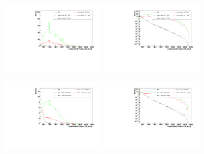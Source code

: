\begin{figure}[h]
  \begin{center}
	\includegraphics[width=0.45\textwidth]{Plots/aQGC_kinematics/ungroomed_PuppiAK8_jet_pt_FS0.pdf}%
	\includegraphics[width=0.45\textwidth]{Plots/aQGC_kinematics/ungroomed_PuppiAK8_jet_pt_FS0_log.pdf}\\
    \caption{}
  \end{center}
\end{figure}
\begin{figure}[h]
  \begin{center}
	\includegraphics[width=0.45\textwidth]{Plots/aQGC_kinematics/ungroomed_PuppiAK8_jet_pt_FS1.pdf}%
	\includegraphics[width=0.45\textwidth]{Plots/aQGC_kinematics/ungroomed_PuppiAK8_jet_pt_FS1_log.pdf}\\
    \caption{}
  \end{center}
\end{figure}
